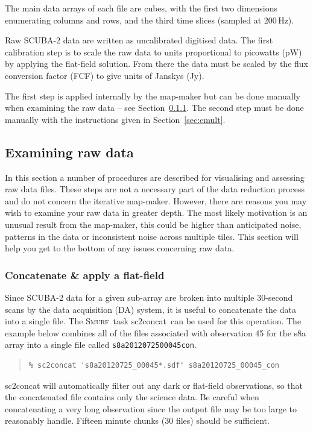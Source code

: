 \documentclass[twoside,11pt]{article}
\newcommand{\htmlref}[2]{#1}
\newcommand{\latexhtml}[2]{#1}
\newcommand{\xref}[3]{#1}
\newcommand{\xlabel}[1]{}
\renewcommand{\_}{\texttt{\symbol{95}}}
\newenvironment{myquote}{\begin{quote}\begin{small}}{\end{small}\end{quote}}
\newcommand{\smurf}{\xref{\textsc{Smurf}}{sun258}{}}
\newcommand{\task}[1]{\textsf{#1}}
\newcommand{\concat}{\xref{\task{sc2concat}}{sun258}{SC2CONCAT}}
\newcommand{\cref}[3]{\latexhtml{#1~\ref{#2}}{\htmlref{#3}{#2}}}
\begin{document}
The main data arrays of each file are cubes, with the first two
dimensions enumerating columns and rows, and the third time slices
(sampled at 200\,Hz).

Raw SCUBA-2 data are written as uncalibrated digitised data. The first calibration
step is to scale the raw data to units proportional to picowatts (pW)
by applying the flat-field solution. From there the data must be
scaled by the flux conversion factor (FCF) to give units of Janskys
(Jy).

The first step is applied internally by the map-maker but can be done
manually when examining the raw data -- see
\cref{Section}{sec:concat}{Concatenate \& apply a flat-field}.
The second step must be done manually with the instructions given in
\cref{Section}{sec:cmult}{Applying the FCF and determining fluxes}.


\subsection{\xlabel{examine}Examining raw data}
\label{sec:exam}

In this section a number of procedures are described for visualising
and assessing raw data files. These steps are not a necessary part of
the data reduction process and do not concern the iterative map-maker.
However, there are reasons you may wish to examine your raw data in
greater depth. The most likely motivation is an unusual result from the
map-maker, this could be higher than anticipated noise, patterns in
the data or inconsistent noise across multiple tiles. This section
will help you get to the bottom of any issues concerning raw data.

\subsubsection{\xlabel{concat}Concatenate \& apply a flat-field}
\label{sec:concat}

Since SCUBA-2 data for a given sub-array are broken into multiple
30-second scans by the data acquisition (DA) system, it is useful to
concatenate the data into a single file. The \smurf\ task \concat\ can
be used for this operation. The example below combines all of the
files associated with observation 45 for the s8a array into a single
file called \texttt{s8a20120725\_00045\_con}.

\begin{myquote}
\begin{verbatim}
% sc2concat 's8a20120725_00045*.sdf' s8a20120725_00045_con
\end{verbatim}
\end{myquote}
\task{sc2concat} will automatically filter out any dark or flat-field
observations, so that the concatenated file contains only the science
data. Be careful when concatenating a very long observation since the
output file may be too large to reasonably handle. Fifteen minute
chunks (30 files) should be sufficient.
\end{document}
